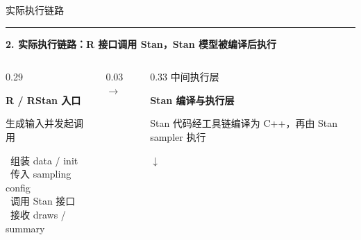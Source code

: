 \documentclass[UTF8,aspectratio=169,fontset=fandol]{ctexbeamer}
\newcommand{\midpaneltopgap}{\vspace{0.35em}}
\newcommand{\midpanelminitopgap}{\vspace{0.55em}}
\begin{document}
\begin{frame}[t,shrink=10]
\vspace{0.2em}
{\color{textgray}\Large 实际执行链路}\par
\vspace{0.35em}
{\color{linegray}\rule{\textwidth}{0.5pt}}\par
\vspace{0.30em}

{\Large\bfseries 2. 实际执行链路：R 接口调用 Stan，Stan 模型被编译后执行}\par
\vspace{0.7em}

\begin{columns}[T,onlytextwidth]
\begin{column}{0.29\textwidth}
\begin{leftpanel}
{\fontsize{14}{16}\selectfont\bfseries\color{blue1} R / RStan 入口}\par
{\small\color{textgray} 生成输入并发起调用}\par
\vspace{0.25em}

\footnotesize
\textbullet\ 组装 data / init\\
\textbullet\ 传入 sampling config\\
\textbullet\ 调用 Stan 接口\\
\textbullet\ 接收 draws / summary
\end{leftpanel}
\end{column}

\begin{column}{0.03\textwidth}
\vspace*{0.17\textheight}
{\fontsize{10}{10}\selectfont\color{arrowgray}$\rightarrow$}
\end{column}

\begin{column}{0.33\textwidth}
\centering
{\small\color{textgray} 中间执行层}\par
\vspace{0.1em}

\begin{midpanel}
{\fontsize{13}{15}\selectfont\bfseries Stan 编译与执行层}\par
\vspace{0.35em}

{\small Stan 代码经工具链编译为 C++，再由 Stan sampler 执行}\par
\midpaneltopgap
{\large\color{arrowgray}$\downarrow$}\par
\midpanelminitopgap


\end{midpanel}
\end{column}
\end{columns}
\end{frame}
\end{document}
